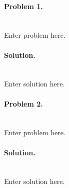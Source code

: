 \documentclass[12pt]{article}
\begin{document}
\MakeTitleDateTop

\paragraph{Problem 1.} \mbox{} \\
Enter problem here. 

\paragraph{Solution.} \mbox{} \\
Enter solution here.

\paragraph{Problem 2.} \mbox{} \\
Enter problem here. 

\paragraph{Solution.} \mbox{} \\
Enter solution here.

\newpage

% 
\end{document}
